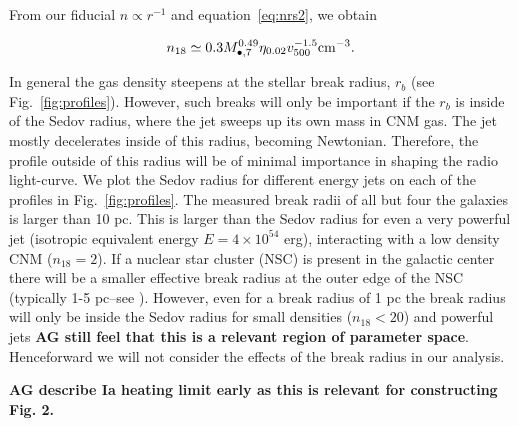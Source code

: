 \documentclass[usenatbib,fleqn]{mnras}
\newcommand{\Mbh}[1][]{M_{\bullet#1}}
\begin{document}
From our fiducial $n\propto r^{-1}$ and equation~\eqref{eq:nrs2}, we
obtain

\begin{equation}
n_{18}\simeq 0.3 \Mbh[,7]^{0.49} \eta_{0.02} v_{500}^{-1.5} {\rm
  cm^{-3}}.
\label{eq:n18}
\end{equation} 


In general the gas density steepens at the stellar break radius, $r_b$
(see Fig.~\ref{fig:profiles}). However, such breaks will only be
important if the $r_b$ is inside of the Sedov radius, where the jet
sweeps up its own mass in CNM gas.  The jet mostly decelerates inside
of this radius, becoming Newtonian. Therefore, the profile outside of
this radius will be of minimal importance in shaping the radio
light-curve. We plot the Sedov radius for different energy jets on
each of the profiles in Fig.~\ref{fig:profiles}. The measured break
radii of all but four the \citet{Lauer+2007} galaxies is larger than
10 pc. This is larger than the Sedov radius for even a very powerful
jet (isotropic equivalent energy $E=4\times 10^{54}$ erg), interacting
with a low density CNM ($n_{18}=2$). If a nuclear star cluster (NSC)
is present in the galactic center there will be a smaller effective
break radius at the outer edge of the NSC (typically 1-5 pc--see
\citealt{Georgiev+2014}). However, even for a break radius of 1 pc the
break radius will only be inside the Sedov radius for small densities
($n_{18}<20$) and powerful jets {\bf AG still feel that this is a
  relevant region of parameter space}. Henceforward we will not
consider the effects of the break radius in our analysis.

{\bf AG describe Ia heating limit early as this is
  relevant for constructing Fig. 2.}
\end{document}
